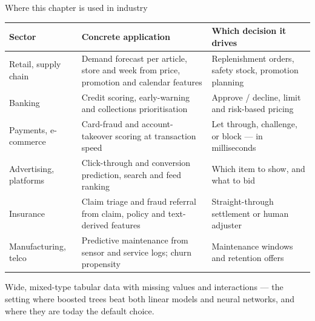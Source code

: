 \documentclass[aspectratio=169,11pt]{beamer}
\begin{document}
\begin{frame}{Where this chapter is used in industry}
  \scriptsize
  \begin{center}
  \begin{tabular}{@{}p{2.5cm}p{5.6cm}p{4.6cm}@{}}
    \toprule
    \textbf{Sector} & \textbf{Concrete application} & \textbf{Which decision it drives} \\
    \midrule
    Retail, supply chain & Demand forecast per article, store and week from price, promotion and calendar features & Replenishment orders, safety stock, promotion planning \\
    Banking & Credit scoring, early-warning and collections prioritisation & Approve / decline, limit and risk-based pricing \\
    Payments, e-commerce & Card-fraud and account-takeover scoring at transaction speed & Let through, challenge, or block --- in milliseconds \\
    Advertising, platforms & Click-through and conversion prediction, search and feed ranking & Which item to show, and what to bid \\
    Insurance & Claim triage and fraud referral from claim, policy and text-derived features & Straight-through settlement or human adjuster \\
    Manufacturing, telco & Predictive maintenance from sensor and service logs; churn propensity & Maintenance windows and retention offers \\
    \bottomrule
  \end{tabular}
  \end{center}
  \begin{industry}
    Wide, mixed-type tabular data with missing values and interactions --- the setting where boosted trees beat both linear models and neural networks, and where they are today the default choice.
  \end{industry}
\end{frame}
\end{document}
